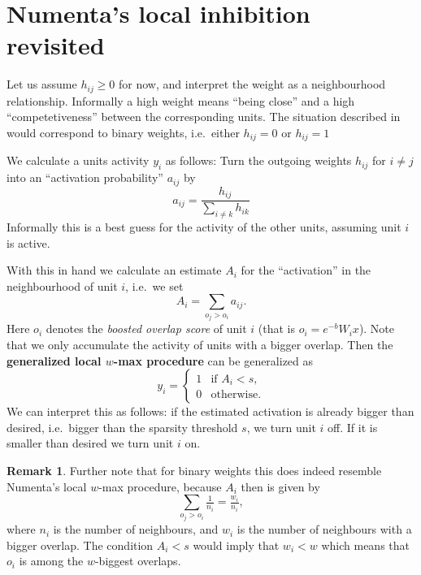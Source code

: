 \documentclass[titlepage]{amsart}
\theoremstyle{definition}
\newtheorem*{rem*}{Remark}
\begin{document}
% 
% 
\section{Numenta's local inhibition revisited}
% 
% 
% 
Let us assume $h_{ij} \geq 0$ for now, and interpret 
the weight as a neighbourhood relationship. Informally a high weight
means ``being close'' and a high ``competetiveness'' between the corresponding units.
The situation described in \cite{sp_paper} would correspond to binary weights, 
i.e.\ either $h_{ij} = 0$ or $h_{ij} = 1$

We calculate a units activity $y_i$ as follows:
Turn the outgoing weights $h_{ij}$ for $i \neq j$ into 
an ``activation probability'' $a_{ij}$ by
\[
      a_{ij} = \frac{h_{ij}}{\mathop{\sum}\limits_{i \neq k} h_{ik} }
\]
Informally this is a best guess for the activity of the other units, assuming
unit $i$ is active.

With this in hand we calculate an estimate $A_i$ for the ``activation''
in the neighbourhood of unit $i$, i.e.\ we set
\[
    A_i = \mathop{\sum}\limits_{o_j > o_i} a_{ij}.
\]
Here $o_i$ denotes the \textit{boosted overlap score} of unit $i$ (that is $o_i = e^{-b} W_i x$).
Note that we only accumulate the activity of units with a bigger overlap.
Then the \textbf{generalized local $w$-max procedure} can be generalized as
% 
\begin{equation}
\label{eqn:numenta unit activity}
      y_i = \begin{cases}
                1 & \text{if } A_i < s, \\
                0 & \text{otherwise}.
            \end{cases}
\end{equation}
% 
We can interpret this as follows: if the estimated activation is already bigger than desired,
i.e.\ bigger than the sparsity threshold $s$, we turn unit $i$ off. If it is smaller than
desired we turn unit $i$ on.
% 
\begin{rem*}
Further note that for binary weights this does indeed resemble Numenta's local $w$-max procedure,
because $A_i$ then is given by 
\[
  \mathop{\sum}\limits_{o_j > o_i} \tfrac{1}{n_i} = \tfrac{w_i}{n_i},
\]
where $n_i$ is the number of neighbours, and $w_i$ is the number of neighbours with a bigger overlap.
The condition $A_i < s$ would imply that $w_i < w$ which means that $o_i$ is among the $w$-biggest overlaps.
\end{rem*}
% 
%
\end{document}
